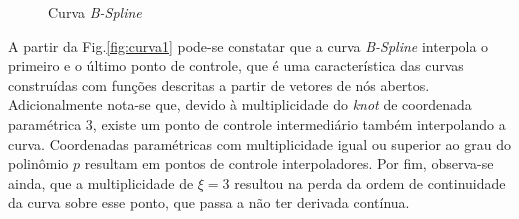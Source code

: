 \documentclass[tese_patricia]{subfiles}
\begin{document}
\begin{figure}[!htb]
	\caption{Curva \textit{B-Spline}}
\end{figure}

A partir da Fig.\ref{fig:curva1} pode-se constatar que a curva \textit{B-Spline} interpola o primeiro e o último ponto de controle, que é uma característica das curvas construídas com funções descritas a partir de vetores de nós abertos. Adicionalmente nota-se que, devido à multiplicidade do \textit{knot} de coordenada paramétrica $3$, existe um ponto de controle intermediário também interpolando a curva. Coordenadas paramétricas com multiplicidade igual ou superior ao grau do polinômio $p$ resultam em pontos de controle interpoladores. Por fim, observa-se ainda, que a multiplicidade de $\xi = 3$ resultou na perda da ordem de continuidade da curva sobre esse ponto, que passa a não ter derivada contínua.
\end{document}
